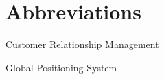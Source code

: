 \chapter*{Abbreviations}

\begin{description}
\setlength{\itemsep}{-11pt}
\setlength{\leftmargin}{900pt}

\item[CRM] Customer Relationship Management
\item[GPS] Global Positioning System


\end{description}
